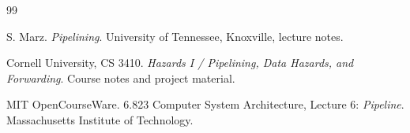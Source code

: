 \documentclass[11pt,a4paper]{report}
\begin{document}
\begin{thebibliography}{99}

S. Marz.
\emph{Pipelining}.
University of Tennessee, Knoxville, lecture notes.

Cornell University, CS 3410.
\emph{Hazards I / Pipelining, Data Hazards, and Forwarding}.
Course notes and project material.

MIT OpenCourseWare.
6.823 Computer System Architecture, Lecture 6:
\emph{Pipeline}.
Massachusetts Institute of Technology.

\end{thebibliography}
\end{document}
